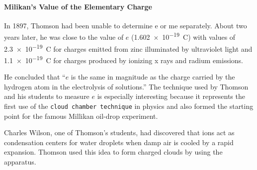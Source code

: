         \paragraph{Milikan's Value of the Elementary Charge} %
        \label{par:Milikan's Value of the Elementary Charge}
        In 1897, Thomson had been unable to determine e or me separately. About two years later, he was close  to the value of $e$ (\SI{1.602e-19}{C}) 
        with values of \SI{2.3e-19}{C} for charges emitted from zinc illuminated by ultraviolet light and \SI{1.1e-19}{C} for charges produced 
        by ionizing x rays and radium emissions. 

        \bulletpar He concluded that “$e$ is the same in magnitude as the charge carried by the 
        hydrogen atom in the electrolysis of solutions.” The technique used by Thomson and his students to measure $e$ is especially 
        interesting because it represents the first use of the \texttt{cloud chamber technique} in physics and also formed the starting point 
        for the famous Millikan oil-drop experiment. 
        
        \bulletpar Charles Wilson, one of Thomson’s students, had discovered that ions act as 
        condensation centers for water droplets when damp air is cooled by a rapid expansion. Thomson used this idea to form charged 
        clouds by using the apparatus.

